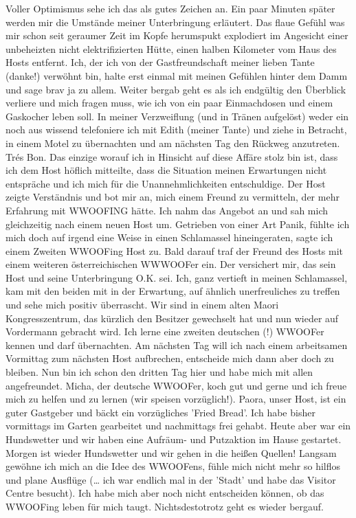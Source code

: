 Voller Optimismus sehe ich das als gutes Zeichen an. Ein paar Minuten
später werden mir die Umstände meiner Unterbringung erläutert. Das flaue
Gefühl was mir schon seit geraumer Zeit im Kopfe herumspukt explodiert
im Angesicht einer unbeheizten nicht elektrifizierten Hütte, einen
halben Kilometer vom Haus des Hosts entfernt. Ich, der ich von der
Gastfreundschaft meiner lieben Tante (danke!) verwöhnt bin, halte erst
einmal mit meinen Gefühlen hinter dem Damm und sage brav ja zu allem.
Weiter bergab geht es als ich endgültig den Überblick verliere und mich
fragen muss, wie ich von ein paar Einmachdosen und einem Gaskocher leben
soll. In meiner Verzweiflung (und in Tränen aufgelöst) weder ein noch
aus wissend telefoniere ich mit Edith (meiner Tante) und ziehe in
Betracht, in einem Motel zu übernachten und am nächsten Tag den Rückweg
anzutreten. Trés Bon. Das einzige worauf ich in Hinsicht auf diese
Affäre stolz bin ist, dass ich dem Host höflich mitteilte, dass die
Situation meinen Erwartungen nicht entspräche und ich mich für die
Unannehmlichkeiten entschuldige. Der Host zeigte Verständnis und bot mir
an, mich einem Freund zu vermitteln, der mehr Erfahrung mit WWOOFING
hätte. Ich nahm das Angebot an und sah mich gleichzeitig nach einem
neuen Host um. Getrieben von einer Art Panik, fühlte ich mich doch auf
irgend eine Weise in einen Schlamassel hineingeraten, sagte ich einem
Zweiten WWOOFing Host zu. Bald darauf traf der Freund des Hosts mit
einem weiteren österreichischen WWWOOFer ein. Der versichert mir, das
sein Host und seine Unterbringung O.K. sei. Ich, ganz vertieft in meinen
Schlamassel, kam mit den beiden mit in der Erwartung, auf ähnlich
unerfreuliches zu treffen und sehe mich positiv überrascht. Wir sind in
einem alten Maori Kongresszentrum, das kürzlich den Besitzer gewechselt
hat und nun wieder auf Vordermann gebracht wird. Ich lerne eine zweiten
deutschen (!) WWOOFer kennen und darf übernachten. Am nächsten Tag will
ich nach einem arbeitsamen Vormittag zum nächsten Host aufbrechen,
entscheide mich dann aber doch zu bleiben. Nun bin ich schon den dritten
Tag hier und habe mich mit allen angefreundet. Micha, der deutsche
WWOOFer, koch gut und gerne und ich freue mich zu helfen und zu lernen
(wir speisen vorzüglich!). Paora, unser Host, ist ein guter Gastgeber
und bäckt ein vorzügliches 'Fried Bread'. Ich habe bisher vormittags im
Garten gearbeitet und nachmittags frei gehabt. Heute aber war ein
Hundswetter und wir haben eine Aufräum- und Putzaktion im Hause
gestartet. Morgen ist wieder Hundswetter und wir gehen in die heißen
Quellen! Langsam gewöhne ich mich an die Idee des WWOOFens, fühle mich
nicht mehr so hilflos und plane Ausflüge (\ldots{} ich war endlich mal
in der 'Stadt' und habe das Visitor Centre besucht). Ich habe mich aber
noch nicht entscheiden können, ob das WWOOFing leben für mich taugt.
Nichtsdestotrotz geht es wieder bergauf.

